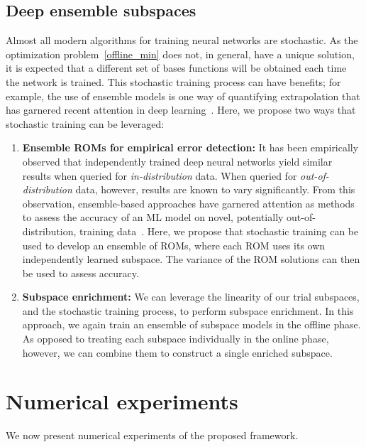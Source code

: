 \documentclass[3p,computermodern,10pt]{elsarticle}
\begin{document}
\subsection{Deep ensemble subspaces} 
Almost all modern algorithms for training neural networks are stochastic. As the optimization problem~\eqref{offline_min} does not, in general, have a unique solution, it is expected that a different set of bases functions will be obtained each time the network is trained. This stochastic training process can have benefits; for example, the use of ensemble models is one way of quantifying extrapolation that has garnered recent attention in deep learning~\cite{deep_ensembles}. Here, we propose two ways that stochastic training can be leveraged:
\begin{enumerate}
\item \textbf{Ensemble ROMs for empirical error detection:} It has been empirically observed that independently trained deep neural networks yield similar results when queried for \textit{in-distribution} data. When queried for \textit{out-of-distribution} data, however, results are known to vary significantly. From this observation, ensemble-based approaches have garnered attention as methods to assess the accuracy of an ML model on novel, potentially out-of-distribution, training data~\cite{deep_ensembles}. Here, we propose that stochastic training can be used to develop an ensemble of ROMs, where each ROM uses its own independently learned subspace. The variance of the ROM solutions can then be used to assess accuracy.   

\item \textbf{Subspace enrichment:} We can leverage the linearity of our trial subspaces, and the stochastic training process, to perform subspace enrichment. In this approach, we again train an ensemble of subspace models in the offline phase. As opposed to treating each subspace individually in the online phase, however, we can combine them to construct a single enriched subspace.
\end{enumerate}  

\section{Numerical experiments}
We now present numerical experiments of the proposed framework.
\end{document}
